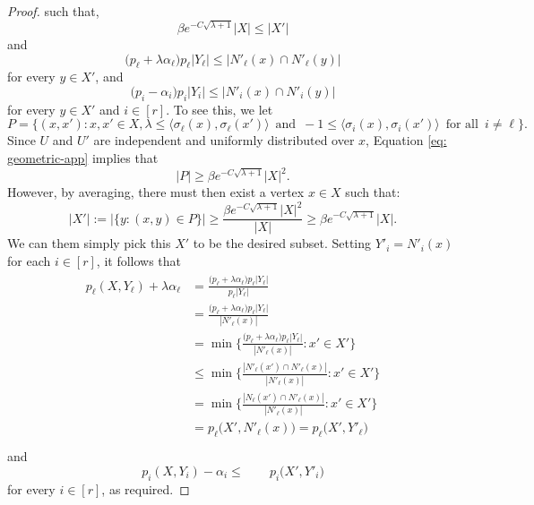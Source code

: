 \begin{proof}
  such that,
  \begin{equation*}
    \beta e^{- C \sqrt{\lambda + 1}} |X| \le |X'|
  \end{equation*}
  and
  \begin{equation*}
    \big( p_\ell + \lambda\alpha_\ell \big) p_\ell |Y_\ell | \le |N'_\ell(x) \cap N'_\ell(y)|
  \end{equation*}
  for every \(y \in X'\), and
  \begin{equation*}
    \big( p_i - \alpha_i \big) p_i |Y_i| \le |N'_i(x) \cap N'_i(y)|
  \end{equation*}
  for every \(y \in X'\) and \(i \in [r]\). To see this, we let 
  \begin{equation*}
     P= \Biggl\{(x,x'): x,x' \in X , \lambda  \le \big\langle \sigma_\ell(x),\sigma_\ell(x') \big\rangle \, \text{ and } \, -1 \le \big\langle \sigma_i(x), \sigma_i(x') \big\rangle \, \text{ for all } \, i \ne \ell  \Biggr\}.
  \end{equation*}
  Since \(U\) and \(U'\) are independent and uniformly distributed over \(x\), Equation \ref{eq: geometric-app} implies that
  \begin{equation}
    |P|\geq \beta e^{-C\sqrt{\lambda + 1}}|X|^2.
  \end{equation} 
  However, by averaging, there must then exist a vertex \(x \in X\) such that:
  \begin{equation}
    |X'|:=\bigl|\{y: (x,y) \in P  \} \bigr| \ge \frac{\beta e^{-C\sqrt{\lambda+1}}|X|^2}{|X|}\geq  \beta e^{-C\sqrt{\lambda+1}}|X|.
  \end{equation}
  We can them simply pick this \(X'\) to be the desired subset.
  Setting \(Y'_i = N'_i(x)\) for each \(i \in [r]\), it follows that
  \begin{multline}
      \begin{aligned}
      p_\ell(X,Y_\ell) + \lambda \alpha_\ell &= \frac{ \big( p_\ell + \lambda\alpha_\ell \big) p_\ell |Y_\ell |}{p_\ell |Y_\ell|}\\
      &= \frac{ \big( p_\ell + \lambda\alpha_\ell \big) p_\ell |Y_\ell |}{| N'_\ell (x)|}\\
      &= \min\bigg\{ \frac{ \big( p_\ell + \lambda\alpha_\ell \big) p_\ell |Y_\ell |}{| N'_\ell (x)|} : x' \in X' \bigg\}\\
      &\le \min\bigg\{ \frac{|N'_\ell(x') \cap  N'_\ell (x)|}{| N'_\ell (x)|} : x' \in X' \bigg\}\\
      &= \min\bigg\{ \frac{|N_\ell(x') \cap  N'_\ell (x)|}{| N'_\ell (x)|} : x' \in X' \bigg\}\\
      &= p_\ell\big( X', N'_\ell (x) \big) = p_\ell\big( X', Y'_\ell \big) \\
    \end{aligned}
  \end{multline}
  and
  \begin{equation*}
    p_i(X,Y_i) - \alpha_i \le \qquad p_i\big( X', Y'_i \big)
  \end{equation*}
  for every \(i \in [r]\), as required.
\end{proof}